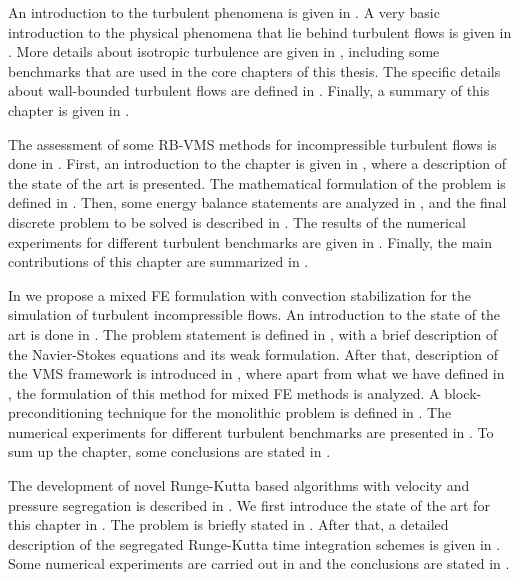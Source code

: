An introduction to the turbulent phenomena is given in . A very basic introduction to the physical phenomena that lie behind turbulent flows is given in . More details about isotropic turbulence are given in , including some benchmarks that are used in the core chapters of this thesis. The specific details about wall-bounded turbulent flows are defined in . Finally, a summary of this chapter is given in .

The assessment of some RB-VMS methods for incompressible turbulent flows is done in . First, an introduction to the chapter is given in , where a description of the state of the art is presented. The mathematical formulation of the problem is defined in . Then, some energy balance statements are analyzed in , and the final discrete problem to be solved is described in . The results of the numerical experiments for different turbulent benchmarks are given in . Finally, the main contributions of this chapter are summarized in .

In  we propose a mixed FE formulation with convection stabilization for the simulation of turbulent incompressible flows. An introduction to the state of the art is done in . The problem statement is defined in , with a brief description of the Navier-Stokes equations and its weak formulation. After that, description of the VMS framework is introduced in , where apart from what we have defined in , the formulation of this method for mixed FE methods is analyzed. A block-preconditioning technique for the monolithic problem is defined in . The numerical experiments for different turbulent benchmarks are presented in . To sum up the chapter, some conclusions are stated in .

The development of novel Runge-Kutta based algorithms with velocity and pressure segregation is described in . We first introduce the state of the art for this chapter in . The problem is briefly stated in . After that, a detailed description of the segregated Runge-Kutta time integration schemes is given in . Some numerical experiments are carried out in  and the conclusions are stated in .

